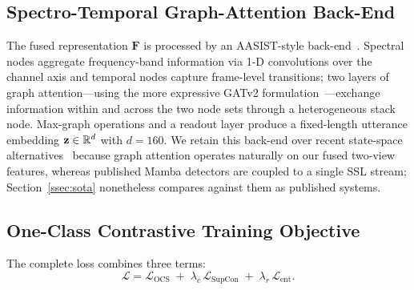 \subsection{Spectro-Temporal Graph-Attention Back-End}
\label{ssec:backend}

The fused representation $\mathbf{F}$ is processed by an AASIST-style
back-end~\cite{jung2022aasist}. Spectral nodes aggregate frequency-band information via
1-D convolutions over the channel axis and temporal nodes capture frame-level
transitions; two layers of graph attention---using the more expressive GATv2
formulation~\cite{brody2022gatv2}---exchange information within and across the two node
sets through a heterogeneous stack node. Max-graph operations and a readout layer
produce a fixed-length utterance embedding $\mathbf{z} \in \mathbb{R}^{d}$ with $d = 160$. We
retain this back-end over recent state-space alternatives~\cite{xiao2025xlsrmamba}
because graph attention operates naturally on our fused two-view features, whereas
published Mamba detectors are coupled to a single SSL stream; Section~\ref{ssec:sota}
nonetheless compares against them as published systems.

\subsection{One-Class Contrastive Training Objective}
\label{ssec:objective}

The complete loss combines three terms:
\begin{equation}
\mathcal{L} = \mathcal{L}_{\text{OCS}} \;+\; \lambda_c \, \mathcal{L}_{\text{SupCon}}
\;+\; \lambda_r \, \mathcal{L}_{\text{ent}} .
\label{eq:loss}
\end{equation}

